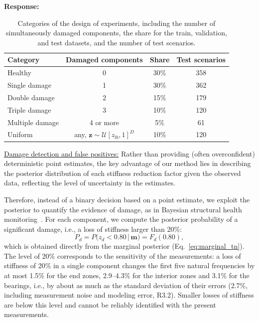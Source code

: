 \documentclass[11pt]{article}
\newenvironment{response}{\par\smallskip\noindent\color{resp}\textbf{Response:}\ }{\par}
\newcommand{\m}{\mathbf{m}}
\newcommand{\z}{\mathbf{z}}
\begin{document}
\begin{response}
\begin{table}[H]
\centering\small
\caption{Categories of the design of experiments, including the number of simultaneously damaged components, the share for the train, validation, and test datasets, and the number of test scenarios.
}
\label{tab:doe}
\begin{tabular}{lccc}
\toprule
Category & Damaged components & Share & Test scenarios \\
\midrule
Healthy & 0 & 30\% & 358 \\
Single damage & 1 & 30\% & 362 \\
Double damage & 2 & 15\% & 179 \\
Triple damage & 3 & 10\% & 120 \\
Multiple damage & 4 or more & 5\% & 61 \\
Uniform & any, $\z\sim\mathcal{U}[z_{lb},1]^D$ & 10\% & 120 \\
\bottomrule
\end{tabular}
\end{table}

\underline{Damage detection and false positives:} Rather than providing (often overconfident) deterministic point estimates, the key advantage of our method lies in describing the posterior distribution of each stiffness reduction factor given the observed data, reflecting the level of uncertainty in the estimates.   

Therefore, instead of a binary decision based on a point estimate, we exploit the posterior to quantify the evidence of damage, as in Bayesian structural health monitoring~\cite{vanik2000bayesian}.
For each component, we compute the posterior probability of a significant damage, i.e., a loss of stiffness larger than 20\%:
\begin{equation}
	P_d=P\big(z_d<0.80\,|\,\m\big)=F_d(0.80),
	\label{eq:pd}
\end{equation}
which is obtained directly from the marginal posterior (Eq.~\eqref{eq:marginal_tn}).
The level of 20\% corresponds to the sensitivity of the measurements: a loss of stiffness of 20\% in a single component changes the first five natural frequencies by at most 1.5\% for the end zones, 2.9--4.3\% for the interior zones and 3.1\% for the bearings, i.e., by about as much as the standard deviation of their errors (2.7\%, including measurement noise and modeling error, R3.2).
Smaller losses of stiffness are below this level and cannot be reliably identified with the present measurements.


\end{response}
\end{document}
